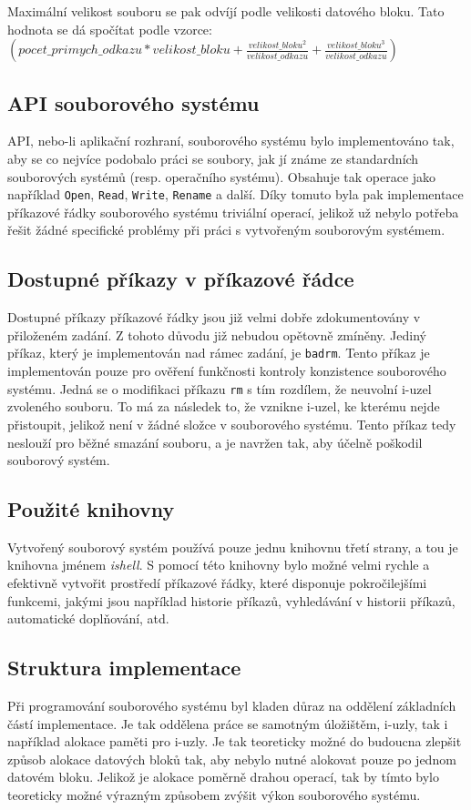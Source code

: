 \documentclass[12pt, a4paper]{article}
\begin{document}
    Maximální velikost souboru se pak odvíjí podle velikosti datového bloku.
    Tato hodnota se dá spočítat podle vzorce:\\$(pocet\_primych\_odkazu*velikost\_bloku+\frac{velikost\_bloku^2}{velikost\_odkazu}+\frac{velikost\_bloku^3}{velikost\_odkazu})$

    \subsection{API souborového systému}
    API, nebo-li aplikační rozhraní, souborového systému bylo implementováno tak, aby se co nejvíce podobalo práci se soubory, jak jí známe ze standardních souborových systémů (resp. operačního systému).
    Obsahuje tak operace jako například \texttt{Open}, \texttt{Read}, \texttt{Write}, \texttt{Rename} a další.
    Díky tomuto byla pak implementace příkazové řádky souborového systému triviální operací, jelikož už nebylo potřeba řešit žádné specifické problémy při práci s vytvořeným souborovým systémem.

    \subsection{Dostupné příkazy v příkazové řádce}
    Dostupné příkazy příkazové řádky jsou již velmi dobře zdokumentovány v přiloženém zadání.
    Z tohoto důvodu již nebudou opětovně zmíněny.
    Jediný příkaz, který je implementován nad rámec zadání, je \texttt{badrm}.
    Tento příkaz je implementován pouze pro ověření funkčnosti kontroly konzistence souborového systému.
    Jedná se o modifikaci příkazu \texttt{rm} s tím rozdílem, že neuvolní i-uzel zvoleného souboru.
    To má za následek to, že vznikne i-uzel, ke kterému nejde přistoupit, jelikož není v žádné složce v souborového systému.
    Tento příkaz tedy neslouží pro běžné smazání souboru, a je navržen tak, aby účelně poškodil souborový systém.


    \subsection{Použité knihovny}
    Vytvořený souborový systém používá pouze jednu knihovnu třetí strany, a tou je knihovna jménem \textit{ishell}.
    S pomocí této knihovny bylo možné velmi rychle a efektivně vytvořit prostředí příkazové řádky, které disponuje pokročilejšími funkcemi, jakými jsou například historie příkazů, vyhledávání v historii příkazů, automatické doplňování, atd.

    \subsection{Struktura implementace}
    Při programování souborového systému byl kladen důraz na oddělení základních částí implementace.
    Je tak oddělena práce se samotným úložištěm, i-uzly, tak i například alokace paměti pro i-uzly.
    Je tak teoreticky možné do budoucna zlepšit způsob alokace datových bloků tak, aby nebylo nutné alokovat pouze po jednom datovém bloku.
    Jelikož je alokace poměrně drahou operací, tak by tímto bylo teoreticky možné výrazným způsobem zvýšit výkon souborového systému.
\end{document}
